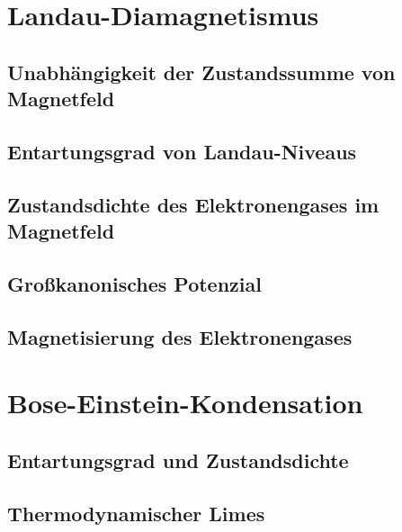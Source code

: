 \fehlt

\section{Landau-Diamagnetismus}

\subsection{Unabhängigkeit der Zustandssumme von Magnetfeld}

\fehlt

\subsection{Entartungsgrad von Landau-Niveaus}

\fehlt

\subsection{Zustandsdichte des Elektronengases im Magnetfeld}

\fehlt

\subsection{Großkanonisches Potenzial}

\fehlt

\subsection{Magnetisierung des Elektronengases}

\fehlt

\section{Bose-Einstein-Kondensation}

\subsection{Entartungsgrad und Zustandsdichte}

\fehlt

\subsection{Thermodynamischer Limes}

\fehlt

